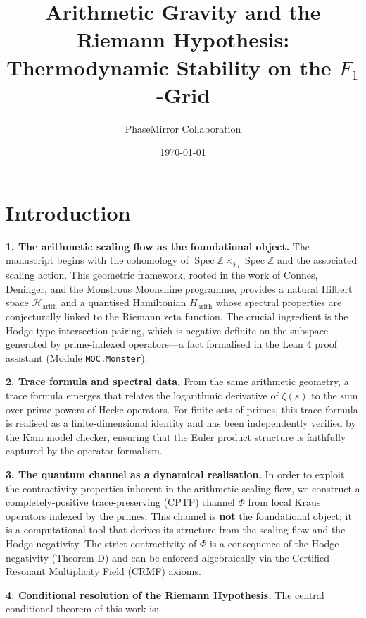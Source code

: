 \documentclass[11pt,a4paper]{article}
\title{Arithmetic Gravity and the Riemann Hypothesis: Thermodynamic Stability on the $F_1$-Grid}
\author{PhaseMirror Collaboration}
\date{\today}
\begin{document}
\maketitle

\begin{abstract}
\end{abstract}

\section{Introduction}
\label{sec:introduction}

\textbf{1. The arithmetic scaling flow as the foundational object.}
The manuscript begins with the cohomology of \(\operatorname{Spec}\mathbb{Z}\times_{\mathbb{F}_1}\operatorname{Spec}\mathbb{Z}\) and the associated scaling action. This geometric framework, rooted in the work of Connes, Deninger, and the Monstrous Moonshine programme, provides a natural Hilbert space \(\mathcal{H}_{\text{arith}}\) and a quantised Hamiltonian \(H_{\text{arith}}\) whose spectral properties are conjecturally linked to the Riemann zeta function. The crucial ingredient is the Hodge‑type intersection pairing, which is negative definite on the subspace generated by prime‑indexed operators—a fact formalised in the Lean 4 proof assistant (Module \texttt{MOC.Monster}).

\textbf{2. Trace formula and spectral data.}
From the same arithmetic geometry, a trace formula emerges that relates the logarithmic derivative of \(\zeta(s)\) to the sum over prime powers of Hecke operators. For finite sets of primes, this trace formula is realised as a finite‑dimensional identity and has been independently verified by the Kani model checker, ensuring that the Euler product structure is faithfully captured by the operator formalism.

\textbf{3. The quantum channel as a dynamical realisation.}
In order to exploit the contractivity properties inherent in the arithmetic scaling flow, we construct a completely‑positive trace‑preserving (CPTP) channel \(\Phi\) from local Kraus operators indexed by the primes. This channel is \textbf{not} the foundational object; it is a computational tool that derives its structure from the scaling flow and the Hodge negativity. The strict contractivity of \(\Phi\) is a consequence of the Hodge negativity (Theorem D) and can be enforced algebraically via the Certified Resonant Multiplicity Field (CRMF) axioms.

\textbf{4. Conditional resolution of the Riemann Hypothesis.}
The central conditional theorem of this work is:
\end{document}
